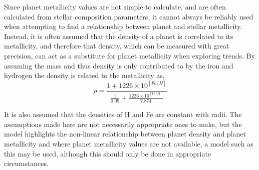 \documentclass[a4paper,twocolumn,12pt]{article}
\begin{document}
Since planet metallicity values are not simple to calculate, and are often calculated from stellar composition parameters, it cannot always be reliably used when attempting to find a relationship between planet and stellar metallicity. Instead, it is often assumed that the density of a planet is correlated to its metallicity, and therefore that density, which can be measured with great precision, can act as a substitute for planet metallicity when exploring trends. By assuming the mass and thus density is only contributed to by the iron and hydrogen the density is related to the metallicity as,
\begin{equation}
\rho = \frac{1 + 1226\times10^{[Fe/H]}}{\frac{1}{0.09}+\frac{1226\times10^{[Fe/H]}}{7.874}}
\label{equation1}
\end{equation}

It is also assumed that the densities of H and Fe are constant with radii. The assumptions made here are not necessarily appropriate ones to make, but the model highlights the non-linear relationship between planet density and planet metallicity and where planet metallicity values are not available, a model such as this may be used, although this should only be done in appropriate circumstances.





\end{document}

